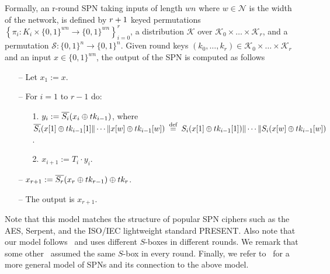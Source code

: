 



Formally, an r-round SPN taking inputs of length $w n$ where $w \in \mathcal{N}$ is the width of the network, is defined by $\mathnormal{r}+1$ keyed permutations $\left\{\pi_{i}: K_{i} \times\{0,1\}^{w n} \rightarrow\{0,1\}^{w n}\right\}_{i=0}^{r}$, a distribution $\mathcal{K}$ over $\mathcal{K}_{0} \times \dots \times \mathcal{K}_{r}$, and a permutation $\mathcal{S}:\{0,1\}^{n} \rightarrow \{0,1\}^{n}$. Given round keys $(k_{0},\dots, k_{r}) \in \mathcal{K}_{0} \times \dots \times \mathcal{K}_{r}$ and an input $x \in \{0,1\}^{w n}$, the output of the SPN is computed as follows

\begin{itemize}
  \item[--]
  Let $x_1 := x$.
  \item[--]
  For $i = 1$ to $r-1$ do:
  \begin{itemize}
  	\item[1.] $y_{i} := \overline{S_i}(x_{i}\oplus tk_{i-1})$, where $\overline{S_i}(x[1]\oplus tk_{i-1}[1]\|\cdots\| x[w]\oplus tk_{i-1}[w]) \stackrel{\text { def }}{=} S_i(x[1]\oplus tk_{i-1}[1])\|\cdots\| S_i(x[w]\oplus tk_{i-1}[w])$.
    \item[2.] 
    $x_{i + 1} := T_i\cdot y_i$.
  \end{itemize}
  \item[--] $x_{r+1} := \overline{S_r}(x_r\oplus tk_{r-1})\oplus tk_r$.
  \item[--]
  The output is $x_{r+1}$.
\end{itemize}

Note that this model matches the structure of popular SPN ciphers such as the AES, Serpent, and the ISO/IEC lightweight standard PRESENT. Also note that our model follows~\cite[Sect. 4.2]{C:CDKLST18} and uses different $S$-boxes in different rounds. We remark that some other~\cite[Sect. 3]{C:CDKLST18} assumed the same $S$-box in every round. Finally, we refer to~\cite[Sect. 2.1]{EPRINT:DKSTZ17} for a more general model of SPNs and its connection to the above model.



